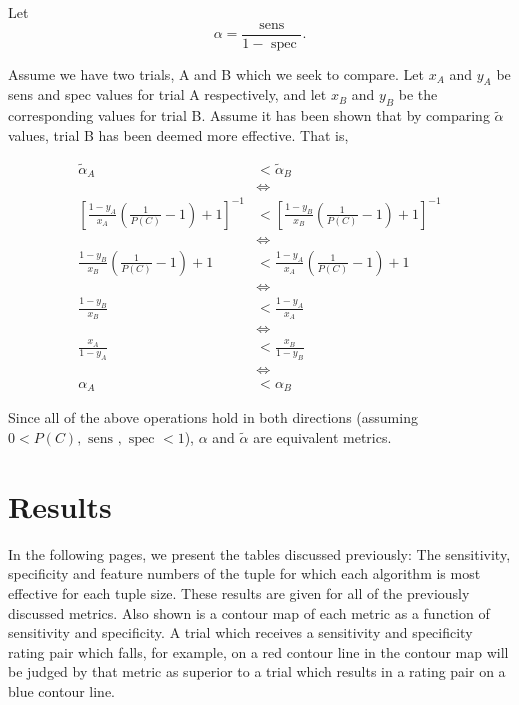 \documentclass[10pt]{article}
\newcommand{\sens}{\mbox{ sens }}
\newcommand{\spec}{\mbox{ spec }}
\begin{document}
Let
\begin{equation}
	\alpha = \frac{\sens}{1-\spec}.
\end{equation}

Assume we have two trials, A and B which we seek to compare. Let $x_A$ and $y_A$ be sens and spec values for trial A respectively, and let $x_B$ and $y_B$ be the corresponding values for trial B. Assume it has been shown that by comparing $\tilde\alpha$ values, trial B has been deemed more effective. That is,

\begin{align*}
	\tilde\alpha_A &< \tilde\alpha_B \\[1em]
&\Leftrightarrow \\[1em]
	\left[\frac{1-y_A}{x_A}\left(\frac{1}{P(C)} - 1 \right) + 1 \right]^{-1} &< 
	\left[\frac{1-y_B}{x_B}\left(\frac{1}{P(C)} - 1 \right) + 1 \right]^{-1} \\[1em]
&\Leftrightarrow \\[1em]
	\frac{1-y_B}{x_B}\left(\frac{1}{P(C)} - 1 \right) + 1  &<
	\frac{1-y_A}{x_A}\left(\frac{1}{P(C)} - 1 \right) + 1  \\[1em] 
&\Leftrightarrow \\[1em]
	\frac{1-y_B}{x_B} &<
	\frac{1-y_A}{x_A} \\[1em] 
&\Leftrightarrow \\[1em]
	\frac{x_A}{1-y_A} &<
	\frac{x_B}{1-y_B} \\[1em]
&\Leftrightarrow \\[1em]
	\alpha_A &< \alpha_B
\end{align*}

Since all of the above operations hold in both directions (assuming $0 < P(C),\sens,\spec < 1$), $\alpha$ and $\tilde\alpha$ are equivalent metrics.

\section{Results}
In the following pages, we present the tables discussed previously: The sensitivity, specificity and feature numbers of the tuple for which each algorithm is most effective for each tuple size. These results are given for all of the previously discussed metrics. Also shown is a contour map of each metric as a function of sensitivity and specificity. A trial which receives a sensitivity and specificity rating pair which falls, for example, on a red contour line in the contour map will be judged by that metric as superior to a trial which results in a rating pair on a blue contour line. \\
\end{document}
